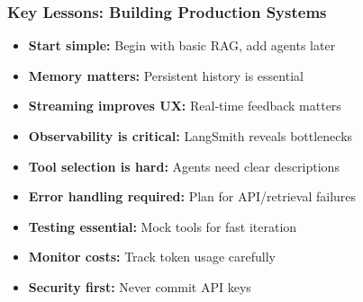 \documentclass[aspectratio=169,11pt]{beamer}
\begin{document}
\begin{frame}
  \frametitle{Key Lessons: Building Production Systems}

  \begin{itemize}
    \item \textbf{Start simple:} Begin with basic RAG, add agents later
    \item \textbf{Memory matters:} Persistent history is essential
    \item \textbf{Streaming improves UX:} Real-time feedback matters
    \item \textbf{Observability is critical:} LangSmith reveals bottlenecks
    \item \textbf{Tool selection is hard:} Agents need clear descriptions
    \item \textbf{Error handling required:} Plan for API/retrieval failures
    \item \textbf{Testing essential:} Mock tools for fast iteration
    \item \textbf{Monitor costs:} Track token usage carefully
    \item \textbf{Security first:} Never commit API keys
  \end{itemize}
\end{frame}
\end{document}
